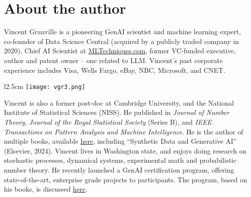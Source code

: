 \documentclass[oneside,10pt]{book}
\begin{document}


\section*{About the author}

Vincent Granville is a pioneering GenAI scientist and machine learning expert, co-founder of Data Science Central 
(acquired by a publicly traded company in 2020), 
 Chief AI Scientist at \href{https://mltechniques.com/}{MLTechniques.com}, former VC-funded executive, author and patent owner -- one related to LLM. 
Vincent’s past corporate experience includes Visa, Wells Fargo, eBay, NBC, Microsoft, and CNET. 


\begin{wrapfigure}{l}{2.5cm}
\texttt{[image: vgr3.png]}
\end{wrapfigure}

\noindent Vincent is also a former post-doc at Cambridge University, and the National Institute of Statistical Sciences (NISS).  
He  published in {\em Journal of Number Theory}, {\em Journal of the Royal Statistical Society} (Series B), and {\em IEEE Transactions on Pattern Analysis and Machine Intelligence}. He is the author of multiple books, available \href{https://mltechniques.com/resources/}{here}, 
 including ``Synthetic Data and Generative AI'' (Elsevier, 2024). Vincent lives  in Washington state, and enjoys doing research on stochastic processes, dynamical systems, experimental math and probabilistic number theory. He recently launched a GenAI certification program,
 offering state-of-the-art, enterprise grade projects to participants. The program, based on his books, is discussed \href{https://mltblog.com/3pWxvZK}{here}.


%


\hypersetup{linkcolor=red}
\tableofcontents 


\end{document}
